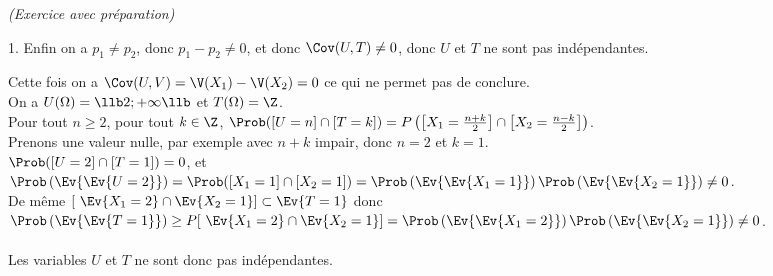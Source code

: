 \documentclass[11pt]{article}%
\begin{document}
\begin{exercice}{\it (Exercice avec préparation)}
\begin{noliste}{1.}
 Enfin on a $p_{1} \neq p_{2}$, donc $p_{1} - p_{2} \neq 0$, et donc
$\Cov ( U,T) \neq 0$, donc $U$ et $T$ ne sont pas indépendantes. \\
 \item Cette fois on a $\Cov (U,V) = \V(X_{1}) - \V(X_{2}) = 0$ ce qui
ne permet pas de conclure. \\
 On a $U (\Omega) = \llb 2 ; + \infty \llb$ et $T(\Omega) = \Z$. \\
 Pour tout $n \geq 2$, pour tout $k \in \Z$, $\Prob( [U = n] \cap [ T =
k] ) = P \left( \left[X_{1} = \frac{n + k}{2}\right] \cap \left[ X_{2}
= \frac{n-k}{2} \right] \right)$. \\
 Prenons une valeur nulle, par exemple avec $n + k$ impair, donc $n =
2$ et $k = 1$. \\
 $\Prob( [U = 2] \cap [T = 1] ) = 0$, et $\Prob\left(\Ev{\Ev{ U =
2}}\right) = \Prob( [ X_{1} = 1] \cap [X_{2} = 1] ) =
\Prob\left(\Ev{\Ev{ X_{1} = 1}}\right) \Prob\left(\Ev{\Ev{X_{2} =
1}}\right) \neq 0$. \\
 De même $ [ \ \Ev{ X_{1} = 2} \cap \Ev{X_{2} = 1}] \subset \Ev{T = 1}$
donc $\Prob\left(\Ev{\Ev{ T = 1}}\right) \geq P [ \ \Ev{ X_{1} = 2}
\cap \Ev{X_{2} = 1}] = \Prob\left(\Ev{\Ev{ X_{1} = 2}}\right)
\Prob\left(\Ev{\Ev{ X_{2} = 1}}\right) \neq 0$. \\
\\
 Les variables $U$ et $T$ ne sont donc pas indépendantes.
 \end{noliste}
 \end{exercice}

 \newpage
\end{document}
